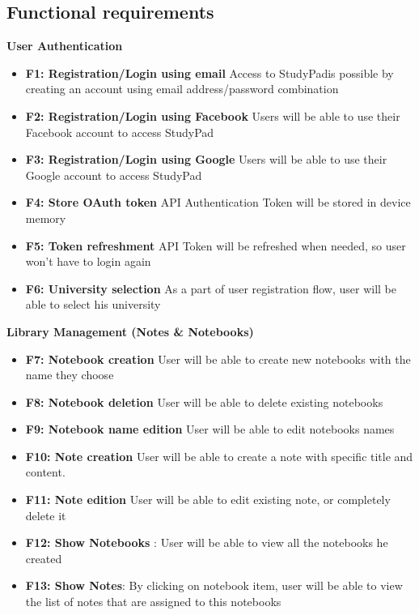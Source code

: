 \documentclass[thesis=B,english]{FITthesis}[2012/10/20]
\newcommand{\appname}{StudyPad\/}
\begin{document}
\subsection{Functional requirements}
\bigskip
\textbf{User Authentication}
\begin{itemize}
	\item \textbf{F1: Registration/Login using email} Access to \appname is possible by creating an account using email address/password combination
	\item \textbf{F2: Registration/Login using Facebook} Users will be able to use their Facebook account to access \appname
	\item \textbf{F3: Registration/Login using Google} Users will be able to use their Google account to access \appname
	\item \textbf{F4: Store OAuth token} API Authentication Token will be stored in device memory
	\item \textbf{F5: Token refreshment} API Token will be refreshed when needed, so user won't have to login again
	\item \textbf{F6: University selection} As a part of user registration flow, user will be able to select his university
\end{itemize}
\bigskip
\textbf{Library Management (Notes \& Notebooks)}
\begin{itemize}
	\item \textbf{F7: Notebook creation} User will be able to create new notebooks with the name they choose
	\item \textbf{F8: Notebook deletion} User will be able to delete existing notebooks
	\item \textbf{F9: Notebook name edition} User will be able to edit notebooks names
	\item \textbf{F10: Note creation} User will be able to create a note with specific title and content.
	\item \textbf{F11: Note edition} User will be able to edit existing note, or completely delete it
	\item \textbf{F12: Show Notebooks} : User will be able to view all the notebooks he created
	\item \textbf{F13: Show Notes}: By clicking on notebook item, user will be able to view the list of notes that are assigned to this notebooks
\end{itemize}
\end{document}
